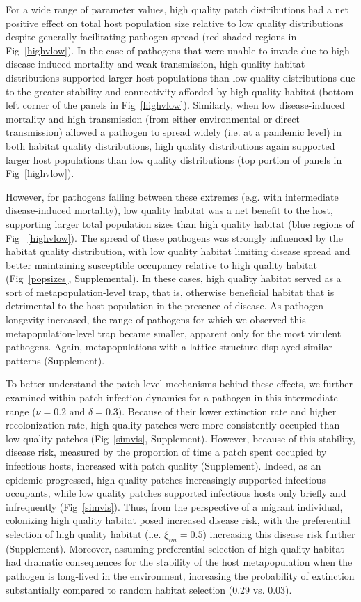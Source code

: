 \documentclass{article}
\begin{document}
For a wide range of parameter values, high quality patch distributions had a net positive effect on total host population size relative to low quality distributions despite generally facilitating pathogen spread (red shaded regions in Fig~\ref{highvlow}).  
In the case of pathogens that were unable to invade due to high disease-induced mortality and weak transmission, high quality habitat distributions supported larger host populations than low quality distributions due to the greater stability and connectivity afforded by high quality habitat (bottom left corner of the panels in Fig~\ref{highvlow}). 
Similarly, when low disease-induced mortality and high transmission (from either environmental or direct transmission) allowed a pathogen to spread widely (i.e. at a pandemic level) in both habitat quality distributions, high quality distributions again supported larger host populations than low quality distributions (top portion of panels in Fig~\ref{highvlow}).

However, for pathogens falling between these extremes (e.g. with intermediate disease-induced mortality), low quality habitat was a net benefit to the host, supporting larger total population sizes than high quality habitat (blue regions of Fig ~\ref{highvlow}).
The spread of these pathogens was strongly influenced by the habitat quality distribution, with low quality habitat limiting disease spread and better maintaining susceptible occupancy relative to high quality habitat (Fig~\ref{popsizes}, Supplemental).
In these cases, high quality habitat served as a sort of metapopulation-level trap, that is, otherwise beneficial habitat that is detrimental to the host population in the presence of disease.
As pathogen longevity increased, the range of pathogens for which we observed this metapopulation-level trap became smaller, apparent only for the most virulent pathogens.
Again, metapopulations with a lattice structure displayed similar patterns (Supplement).

To better understand the patch-level mechanisms behind these effects, we further examined within patch infection dynamics for a pathogen in this intermediate range ($\nu = 0.2$ and $\delta = 0.3$).  
Because of their lower extinction rate and higher recolonization rate, high quality patches were more consistently occupied than low quality patches (Fig~\ref{simvis}, Supplement).  
However, because of this stability, disease risk, measured by the proportion of time a patch spent occupied by infectious hosts, increased with patch quality (Supplement).
Indeed, as an epidemic progressed, high quality patches increasingly supported infectious occupants, while low quality patches supported infectious hosts only briefly and infrequently (Fig~\ref{simvis}).  
Thus, from the perspective of a migrant individual, colonizing high quality habitat posed increased disease risk, with the preferential selection of high quality habitat (i.e. $\xi_{im} = 0.5$) increasing this disease risk further (Supplement).
Moreover, assuming preferential selection of high quality habitat had dramatic consequences for the stability of the host metapopulation when the pathogen is long-lived in the environment, increasing the probability of extinction substantially compared to random habitat selection (0.29 vs. 0.03).
\end{document}
